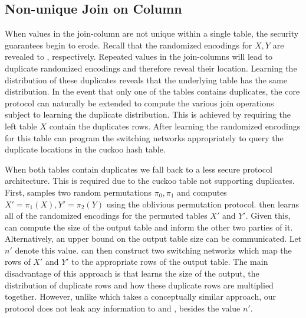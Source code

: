 \subsection{Non-unique Join on Column}


When values in the join-column are not unique within a single table, the security guarantees begin to erode. Recall that the randomized encodings for $X,Y$ are revealed to ,  respectively. Repeated values in the join-columns will lead to duplicate randomized encodings and therefore reveal their location. Learning the distribution of these duplicates reveals that the underlying table has the same distribution. In the event that only one of the tables contains duplicates, the core protocol can naturally be extended to compute the various join operations subject to  learning the duplicate distribution. This is achieved by requiring the left table $X$ contain the duplicates rows. After learning the randomized encodings for this table  can program the switching networks appropriately to query the duplicate locations in the cuckoo hash table. 


When both tables contain duplicates we fall back to a less secure protocol architecture. This is required due to the cuckoo table not supporting duplicates. First,  samples two random permutations $\pi_0,\pi_1$ and computes $X'=\pi_1(X),Y'=\pi_2(Y)$ using the oblivious permutation protocol.  then learns all of the randomized encodings for the permuted tables $X'$ and $Y'$. Given this,  can compute the size of the output table and inform the other two parties of it. Alternatively, an upper bound on the output table size can be communicated. Let $n'$ denote this value.  can then construct two switching networks which map the rows of $X'$ and $Y'$ to the appropriate rows of the output table. The main disadvantage of this approach is that  learns the size of the output, the distribution of duplicate rows and how these duplicate rows are multiplied together. However, unlike \cite{LTW13} which takes a conceptually similar approach, our protocol does not leak any information to  and , besides the value $n'$.


